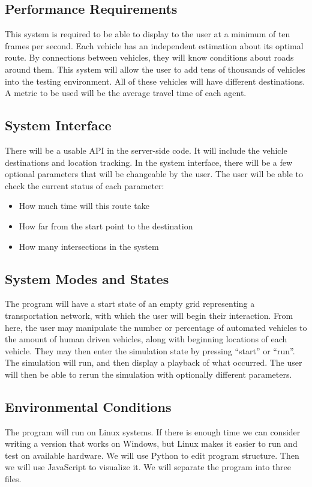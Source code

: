 \documentclass[onecolumn, draftclsnofoot,10pt, compsoc]{IEEEtran}
\begin{document}
\subsection{Performance Requirements}
This system is required to be able to display to the user at a minimum of ten frames per second.
Each vehicle has an independent estimation about its optimal route.
By connections between vehicles, they will know conditions about roads around them.
This system will allow the user to add tens of thousands of vehicles into the testing environment.
All of these vehicles will have different destinations.
A metric to be used will be the average travel time of each agent.
\subsection{System Interface}
There will be a usable API in the server-side code.
It will include the vehicle destinations and location tracking.
In the system interface, there will be a few optional parameters that will be changeable by the user.
The user will be able to check the current status of each parameter:
\begin{itemize}
\item How much time will this route take
\item How far from the start point to the destination
\item How many intersections in the system
\end{itemize}
\subsection{System Modes and States}
The program will have a start state of an empty grid representing a transportation network, with which the user will begin their interaction.
From here, the user may manipulate the number or percentage of automated vehicles to the amount of human driven vehicles, along with beginning locations of each vehicle.
They may then enter the simulation state by pressing “start” or “run”.
The simulation will run, and then display a playback of what occurred.
The user will then be able to rerun the simulation with optionally different parameters.
\subsection{Environmental Conditions}
The program will run on Linux systems.
If there is enough time we can consider writing a version that works on Windows, but Linux makes it easier to run and test on available hardware.
We will use Python to edit program structure.
Then we will use JavaScript to visualize it.
We will separate the program into three files.
\end{document}
